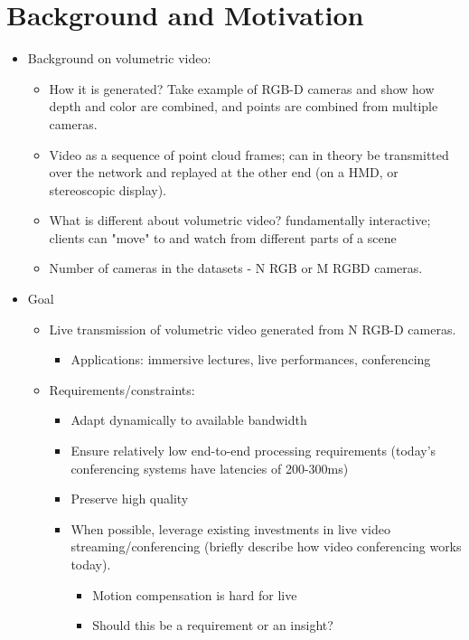 \section{Background and Motivation}
\label{s:background}


\begin{itemize}
	\item Background on volumetric video:
	\begin{itemize}
		\item How it is generated? Take example of RGB-D cameras and show how depth and color are combined, and points are combined from multiple cameras.
		\item Video as a sequence of point cloud frames; can in theory be transmitted over the network and replayed at the other end (on a HMD, or stereoscopic display).
		\item What is different about volumetric video? fundamentally interactive; clients can "move" to and watch from different parts of a scene
            \item Number of cameras in the datasets - N RGB or M RGBD cameras. 
	\end{itemize}
	
	\item Goal
	\begin{itemize}
		\item Live transmission of volumetric video generated from N RGB-D cameras. 
		\begin{itemize}
			\item Applications: immersive lectures, live performances, conferencing
		\end{itemize}
	
		\item Requirements/constraints:
		\begin{itemize}
			\item Adapt dynamically to available bandwidth
			\item Ensure relatively low end-to-end processing requirements (today's conferencing systems have latencies of 200-300ms)
			\item Preserve high quality
			\item When possible, leverage existing investments in live video streaming/conferencing (briefly describe how video conferencing works today).
			\begin{itemize}
				\item Motion compensation is hard for live
				\item  Should this be a requirement or an insight?\
			\end{itemize}
		\end{itemize}
	\end{itemize}
	

\end{itemize}
